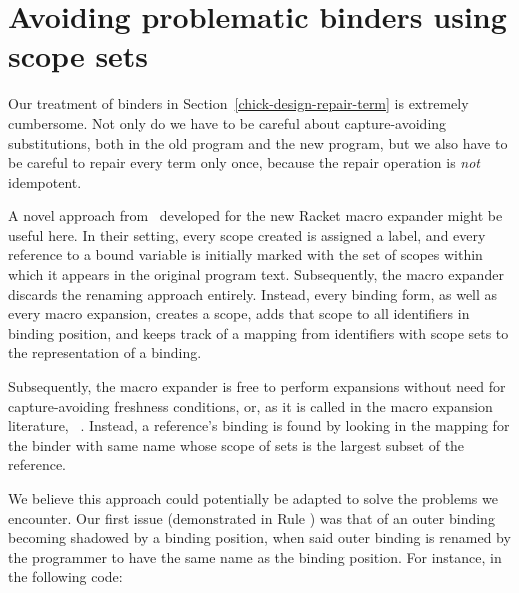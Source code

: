 \section{Avoiding problematic binders using scope sets}

Our treatment of binders in Section~\ref{chick-design-repair-term} is extremely
cumbersome.  Not only do we have to be careful about capture-avoiding
substitutions, both in the old program and the new program, but we also have to
be careful to repair every term only once, because the repair operation is
\emph{not} idempotent.

A novel approach from~ developed for the new Racket
macro expander might be useful here.  In their setting, every scope created is
assigned a label, and every reference to a bound variable is initially marked
with the set of scopes within which it appears in the original program text.
Subsequently, the macro expander discards the renaming approach entirely.
Instead, every binding form, as well as every macro expansion, creates a scope,
adds that scope to all identifiers in binding position, and keeps track of a
mapping from identifiers with scope sets to the representation of a binding.

Subsequently, the macro expander is free to perform expansions without need for
capture-avoiding freshness conditions, or, as it is called in the macro
expansion literature, ~.  Instead, a reference's binding is
found by looking in the mapping for the binder with same name whose scope of
sets is the largest subset of the reference.

We believe this approach could potentially be adapted to solve the problems we
encounter.  Our first issue (demonstrated in Rule ) was that
of an outer binding becoming shadowed by a binding position, when said outer
binding is renamed by the programmer to have the same name as the binding
position.  For instance, in the following code:

\begin{figure*}[htp]
\noindent
\cprotect{}%
\cprotect{}%
\end{figure*}

